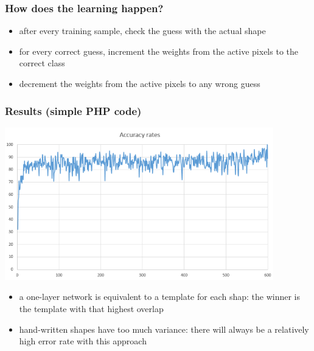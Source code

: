 \documentclass[xcolor=table]{beamer}
\begin{document}
\begin{mdframe}%

\frametitle{How does the learning happen?}\label{heading-sec-how-does-the-learning-happen}%

\begin{itemize}%

\item{}
after every training sample, check the guess with the actual shape%

\item{}
for every correct guess, increment the weights from the active pixels to the correct class%

\item{}
decrement the weights from the active pixels to any wrong guess%
\end{itemize}%
\end{mdframe}\label{sec-how-does-the-learning-happen}%

\begin{mdframe}%

\frametitle{Results (simple PHP code)}\label{heading-sec-results-simple-php-code}%

\noindent{}\includegraphics[keepaspectratio=true,width=\dimmin{}{\dimwidth{0.90}}]{images/php1layer}{}%

\begin{itemize}%

\item{}
a one-layer network is equivalent to a template for each shap: the winner is the template with that highest overlap%

\item{}
hand-written shapes have too much variance: there will always be a relatively high error rate with this approach%
\end{itemize}%
\end{mdframe}\label{sec-results-simple-php-code}%
\end{document}
